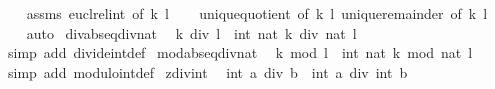 \begin{isabellebody}
%
\isadelimproof
\ \ %
\endisadelimproof
%
\isatagproof
{}\isamarkupfalse%
\ assms\ eucl{\isacharunderscore}{\kern0pt}rel{\isacharunderscore}{\kern0pt}int\ {\isacharbrackleft}{\kern0pt}of\ k\ l{\isacharbrackright}{\kern0pt}\isanewline
\ \ \isamarkupfalse%
\ unique{\isacharunderscore}{\kern0pt}quotient\ {\isacharbrackleft}{\kern0pt}of\ k\ l{\isacharbrackright}{\kern0pt}\ unique{\isacharunderscore}{\kern0pt}remainder\ {\isacharbrackleft}{\kern0pt}of\ k\ l{\isacharbrackright}{\kern0pt}\isanewline
\ \ \isamarkupfalse%
\ auto%
\endisatagproof
{\isafoldproof}%
%
\isadelimproof
\isanewline
%
\endisadelimproof
\isanewline
{}\isamarkupfalse%
\ div{\isacharunderscore}{\kern0pt}abs{\isacharunderscore}{\kern0pt}eq{\isacharunderscore}{\kern0pt}div{\isacharunderscore}{\kern0pt}nat{\isacharcolon}{\kern0pt}\isanewline
\ \ {\isachardoublequoteopen}{\isasymbar}k{\isasymbar}\ div\ {\isasymbar}l{\isasymbar}\ {\isacharequal}{\kern0pt}\ int\ {\isacharparenleft}{\kern0pt}nat\ {\isasymbar}k{\isasymbar}\ div\ nat\ {\isasymbar}l{\isasymbar}{\isacharparenright}{\kern0pt}{\isachardoublequoteclose}\isanewline
%
\isadelimproof
\ \ %
\endisadelimproof
%
\isatagproof
{}\isamarkupfalse%
\ {\isacharparenleft}{\kern0pt}simp\ add{\isacharcolon}{\kern0pt}\ divide{\isacharunderscore}{\kern0pt}int{\isacharunderscore}{\kern0pt}def{\isacharparenright}{\kern0pt}%
\endisatagproof
{\isafoldproof}%
%
\isadelimproof
\isanewline
%
\endisadelimproof
\isanewline
{}\isamarkupfalse%
\ mod{\isacharunderscore}{\kern0pt}abs{\isacharunderscore}{\kern0pt}eq{\isacharunderscore}{\kern0pt}div{\isacharunderscore}{\kern0pt}nat{\isacharcolon}{\kern0pt}\isanewline
\ \ {\isachardoublequoteopen}{\isasymbar}k{\isasymbar}\ mod\ {\isasymbar}l{\isasymbar}\ {\isacharequal}{\kern0pt}\ int\ {\isacharparenleft}{\kern0pt}nat\ {\isasymbar}k{\isasymbar}\ mod\ nat\ {\isasymbar}l{\isasymbar}{\isacharparenright}{\kern0pt}{\isachardoublequoteclose}\isanewline
%
\isadelimproof
\ \ %
\endisadelimproof
%
\isatagproof
{}\isamarkupfalse%
\ {\isacharparenleft}{\kern0pt}simp\ add{\isacharcolon}{\kern0pt}\ modulo{\isacharunderscore}{\kern0pt}int{\isacharunderscore}{\kern0pt}def{\isacharparenright}{\kern0pt}%
\endisatagproof
{\isafoldproof}%
%
\isadelimproof
\isanewline
%
\endisadelimproof
\isanewline
{}\isamarkupfalse%
\ zdiv{\isacharunderscore}{\kern0pt}int{\isacharcolon}{\kern0pt}\isanewline
\ \ {\isachardoublequoteopen}int\ {\isacharparenleft}{\kern0pt}a\ div\ b{\isacharparenright}{\kern0pt}\ {\isacharequal}{\kern0pt}\ int\ a\ div\ int\ b{\isachardoublequoteclose}\isanewline

\end{isabellebody}
